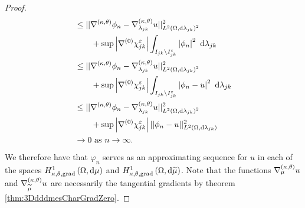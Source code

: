 \begin{proof}
\begin{align*}
		&\leq \norm{ \ktgrad\phi_n - \ktgrad_{\lambda_{jk}}u }_{\ltwo{\ddom}{\lambda_{jk}}^2}^2 \\
		&\qquad + \sup\abs{\ograd\chi_{jk}^\eps}\integral{I_{jk}\setminus I_{jk}^\eps}{ \abs{\phi_n}^2 }{\lambda_{jk}} \\
		&\leq \norm{ \ktgrad\phi_n - \ktgrad_{\lambda_{jk}}u }_{\ltwo{\ddom}{\lambda_{jk}}^2}^2 \\
		&\qquad + \sup\abs{\ograd\chi_{jk}^\eps}\integral{I_{jk}\setminus I_{jk}^\eps}{ \abs{\phi_n - u}^2 }{\lambda_{jk}} \\
		&\leq \norm{ \ktgrad\phi_n - \ktgrad_{\lambda_{jk}}u }_{\ltwo{\ddom}{\lambda_{jk}}^2}^2 \\
		&\qquad + \sup\abs{\ograd\chi_{jk}^\eps}\norm{ \phi_n - u }_{\ltwo{\ddom}{\lambda_{jk}}}^2 \\
		&\rightarrow0 \toInfty{n}.
	\end{align*}
	We therefore have that $\varphi_n$ serves as an approximating sequence for $u$ in each of the spaces $\ktgradSob{\ddom}{\ddmes}$ and $\ktgradSob{\ddom}{\dddmes}$.
	Note that the functions $\ktgrad_{\ddmes}u$ and $\ktgrad_{\dddmes}u$ are necessarily the tangential gradients by theorem \ref{thm:3DdddmesCharGradZero}.
\end{proof}


